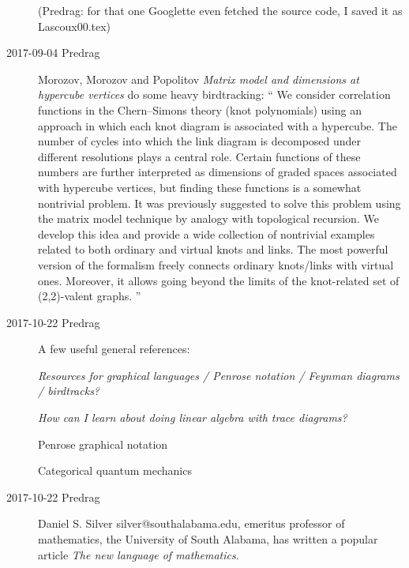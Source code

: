 \begin{description}
(Predrag: for that one Googlette even fetched the source code, I saved it as
Lascoux00.tex)

\item[2017-09-04 Predrag]
Morozov, Morozov  and Popolitov
{\em Matrix model and dimensions at hypercube vertices}
do some heavy birdtracking: ``
We consider correlation functions in the Chern--Simons theory (knot
polynomials) using an approach in which each knot diagram is associated with
a hypercube. The number of cycles into which the link diagram is decomposed
under different resolutions plays a central role. Certain functions of these
numbers are further interpreted as dimensions of graded spaces associated
with hypercube vertices, but finding these functions is a somewhat nontrivial
problem. It was previously suggested to solve this problem using the matrix
model technique by analogy with topological recursion. We develop this idea
and provide a wide collection of nontrivial examples related to both ordinary
and virtual knots and links. The most powerful version of the formalism
freely connects ordinary knots/links with virtual ones. Moreover, it allows
going beyond the limits of the knot-related set of (2,2)-valent graphs.
''

\item[2017-10-22 Predrag]
A few useful general references:

{\em Resources for graphical languages / Penrose notation / Feynman diagrams /
{birdtracks?}
}

{\em How can I learn about doing linear algebra with
{trace diagrams?}
}

{Penrose graphical notation}

\HREF{}
{}

\HREF{}
{}

{Categorical quantum mechanics}

\item[2017-10-22 Predrag]
{Daniel S. Silver} silver@southalabama.edu, emeritus professor of mathematics,
the University of South Alabama, has written a popular article
{\em The new language of mathematics}.


\end{description}

